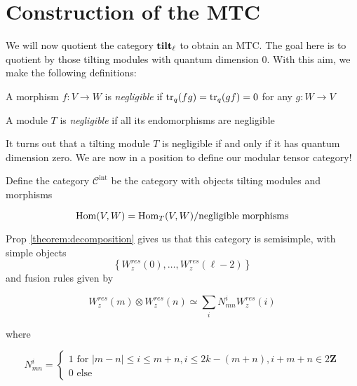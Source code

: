 \section{Construction of the MTC}
\label{MTC-construction}


We will now quotient the category $\mathbf{tilt}_\ell$ to obtain an MTC. The goal here is to
quotient by those tilting modules with quantum dimension 0. With this aim, we
make the following definitions:

\begin{defn}
    A morphism $f: V \to W$ is \emph{negligible} if $\operatorname{tr}_q(fg) = \operatorname{tr}_q(gf) = 0$ for any $g: W \to V$
\end{defn}

\begin{defn}
A module $T$ is \emph{negligible} if all its endomorphisms are negligible
\end{defn}

It turns out that a tilting module $T$ is negligible if and only if it has
quantum dimension zero. We are now in a position to define our modular tensor category!

Define the category $\mathcal{C}^\text{int}$ be the category with objects tilting modules and morphisms 

    \begin{equation*}
        \operatorname{Hom}(V,W) = \operatorname{Hom}_T(V,W) / \text{negligible morphisms}
    \end{equation*}

Prop \ref{theorem:decomposition} gives us that this category is semisimple,
with simple objects 
\begin{equation}
\left\{ W_z^{res}(0), \ldots, W_z^{res}(\ell-2) \right\}
\end{equation}
and fusion rules given by

\begin{equation}
    W_z^{res}(m) \otimes W_z^{res}(n) \simeq \sum_i N_{mn}^i W_z^{res}(i)
\end{equation}

where 

\begin{equation}
    N_{mn}^i = \begin{cases} 1 \text{ for } |m-n| \leq i \leq m+n, i \leq 2k - (m+n), i + m + n \in 2 \mathbf{Z} \\
                             0 \text{ else } 
               \end{cases}
\end{equation}


